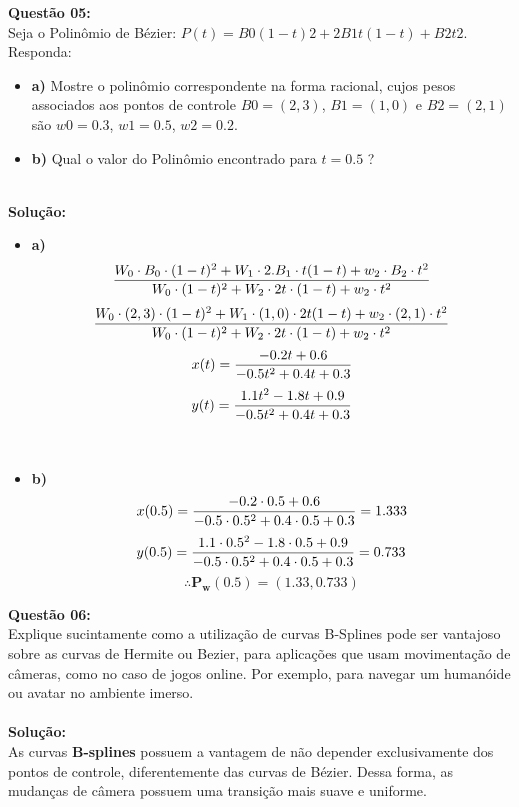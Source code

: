 \documentclass[a4paper, 12pt]{article}
\begin{document}
\vspace{1cm}
\noindent\textbf{Questão 05:}\\
Seja o Polinômio de Bézier: $P (t) = B0(1 − t)2 + 2B1t(1 − t) + B2t2$. Responda:
\begin{itemize}
\item \textbf{a)} Mostre o polinômio correspondente na forma racional, cujos pesos associados aos pontos de
controle $B0 = (2, 3)$, $B1 = (1, 0)$ e $B2 = (2, 1)$ são $w0 = 0.3$, $w1 = 0.5$, $w2 = 0.2$.
\item \textbf{b)} Qual o valor do Polinômio encontrado para $t = 0.5$ ?
\end{itemize}
\\
\noindent\textbf{Solução:}
\begin{itemize}
\item\textbf{a)} 
	\[
		\frac{W_0 \cdot B_0 \cdot (1-t)^2 + W_1 \cdot 2.B_1 \cdot t(1-t) + w_2 \cdot B_2 \cdot t^2}{W_0 \cdot (1-t)^2 + W_2 \cdot 2t \cdot (1-t) + w_2 \cdot t^2}
		\vspace{0.5cm}
	\]
	\[
	    \frac{W_0 \cdot (2, 3) \cdot (1-t)^2 + W_1 \cdot (1, 0) \cdot 2t(1-t) + w_2 \cdot (2, 1) \cdot t^2}{W_0 \cdot (1-t)^2 + W_2 \cdot 2t \cdot (1-t) + w_2 \cdot t^2}
		\vspace{0.5cm}
	\]
	\[
	    x(t) =
	    \frac{-0.2t + 0.6}{-0.5t^2 + 0.4t + 0.3}
	    \vspace{0.5cm}
	\]
	\[
	    y(t) =
	    \frac{1.1t^2 -1.8t + 0.9}{-0.5t^2 + 0.4t + 0.3}
	    \vspace{0.5cm}
	\]
	
\\
\item\textbf{b)}
    \[
        x(0.5) =
        \frac{-0.2 \cdot 0.5 + 0.6}{-0.5 \cdot 0.5^2 + 0.4 \cdot 0.5 + 0.3} = 1.333
        \vspace{0.5cm}
    \]
    \[
        y(0.5) =
        \frac{1.1 \cdot 0.5^2 - 1.8 \cdot 0.5 + 0.9}{-0.5 \cdot 0.5^2 + 0.4 \cdot 0.5 + 0.3} = 0.733
        \vspace{0.5cm}
    \]
    \[
         \therefore  \mathbf{P_w(0.5) = (1.33, 0.733)}
    \]
\end{itemize}
\vspace{1cm}
\noindent\textbf{Questão 06:}\\
Explique sucintamente como a utilização de curvas B-Splines pode ser vantajoso sobre as curvas
de Hermite ou Bezier, para aplicações que usam movimentação de câmeras, como no caso de
jogos online. Por exemplo, para navegar um humanóide ou avatar no ambiente imerso.\\
\\
\noindent\textbf{Solução:}
\\
As curvas \textbf{B-splines} possuem a vantagem de não depender exclusivamente dos pontos de controle, diferentemente das curvas de Bézier. Dessa forma, as mudanças de câmera possuem uma transição mais suave e uniforme.
\end{document}
